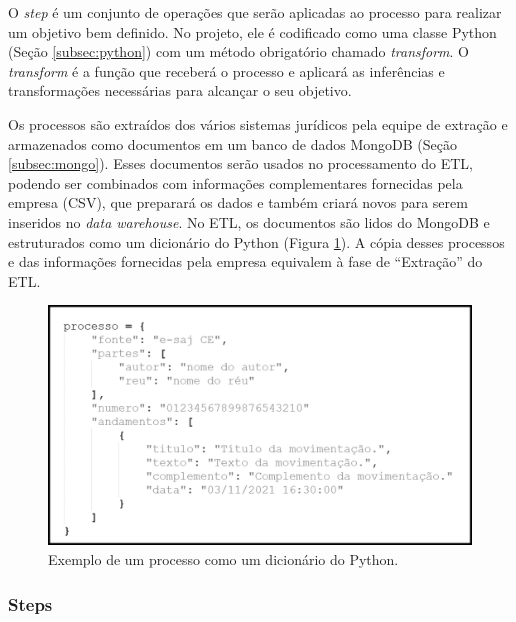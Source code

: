 O \textit{step} é um conjunto de operações que serão aplicadas ao processo para realizar um objetivo bem definido. No projeto, ele é codificado como uma classe Python (Seção \ref{subsec:python}) com um método obrigatório chamado \textit{transform}. O \textit{transform} é a função que receberá o processo e aplicará as inferências e transformações necessárias para alcançar o seu objetivo.

Os processos são extraídos dos vários sistemas jurídicos pela equipe de extração e armazenados como documentos em um banco de dados MongoDB (Seção \ref{subsec:mongo}). Esses documentos serão usados no processamento do ETL, podendo ser combinados com informações complementares fornecidas pela empresa (CSV), que preparará os dados e também criará novos para serem inseridos no \textit{data warehouse}. No ETL, os documentos são lidos do MongoDB e estruturados como um dicionário do Python (Figura \ref{fig:processoPython}). A cópia desses processos e das informações fornecidas pela empresa equivalem à fase de \enquote{Extração} do ETL.

\begin{figure}[ht]
\centering
\includegraphics[width=1\textwidth]{imagens/processo-python.png}
\caption{Exemplo de um processo como um dicionário do Python.}
\label{fig:processoPython}
\end{figure}


\subsubsection{Steps}
\label{subsec:steps}

